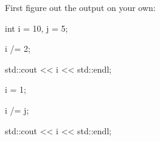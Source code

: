 First figure out the output on your own:

\begin{console}

int i = 10, j = 5;



i /= 2;

std::cout << i << std::endl;



i = 1;

i /= j;

std::cout << i << std::endl;

\end{console}

